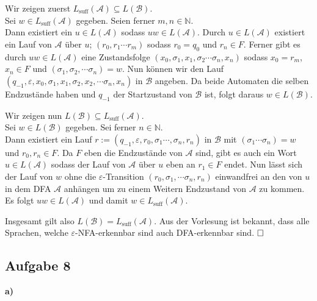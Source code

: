 \documentclass[a4paper,graphics,11pt]{article}
\newcommand{\aufgabe}[1]{\subsection*{Aufgabe #1}}
\begin{document}
Wir zeigen zuerst $L_{\text{suff}}(\mathcal{A}) \subseteq L(\mathcal{B})$.\\[2pt]
Sei $w \in L_{\text{suff}}(\mathcal{A})$ gegeben. Seien ferner $m,n \in \mathbb{N}$.\\
Dann existiert ein $u \in L(\mathcal{A})$ sodass $uw \in L(\mathcal{A})$.
Durch $u \in L(\mathcal{A})$ existiert ein Lauf von $\mathcal{A}$ über $u$;
$(r_0, r_1 \cdots r_m)$ sodass $r_0 = q_0$ und $r_n \in F$.
Ferner gibt es durch $uw \in L(\mathcal{A})$ eine Zustandsfolge
$(x_0, \sigma_1, x_1, \sigma_2 \cdots \sigma_n, x_n)$ sodass $x_0 = r_m$, $x_n \in F$ und
$(\sigma_1, \sigma_2, \cdots \sigma_n) = w$. Nun können wir den Lauf $(q_{-1}, \varepsilon, x_0, \sigma_1, x_1, \sigma_2, x_2, \cdots \sigma_n, x_n)$ in $\mathcal{B}$ angeben. Da beide
Automaten die selben Endzustände haben und $q_{-1}$ der Startzustand von $\mathcal{B}$ ist, folgt daraus $w \in L(\mathcal{B})$.
\newpage

Wir zeigen nun $L(\mathcal{B}) \subseteq L_{\text{suff}}(\mathcal{A})$.\\[2pt]
Sei $w \in L(\mathcal{B})$ gegeben. Sei ferner $n \in \mathbb{N}$.\\
Dann existiert ein Lauf $r := (q_{-1}, \varepsilon, r_0, \sigma_1 \cdots, \sigma_n, r_n)$
in $\mathcal{B}$ mit $(\sigma_1 \cdots \sigma_n) = w$ und $r_0, r_n \in F$.
Da $F$ eben die Endzustände von $\mathcal{A}$ sind, gibt es auch ein Wort $u \in L(\mathcal{A})$ sodass der Lauf von $\mathcal{A}$ über $u$ eben an $r_1 \in F$ endet. Nun lässt sich der Lauf
von $w$ ohne die $\varepsilon$-Transition $(r_0, \sigma_1, \cdots \sigma_n, r_n)$ einwandfrei
an den von $u$ in dem DFA $\mathcal{A}$ anhängen um zu einem Weitern Endzustand von $\mathcal{A}$ zu kommen. Es folgt $uw \in L(\mathcal{A})$ und damit $w \in L_{\text{suff}}(\mathcal{A})$.

Insgesamt gilt also $L(\mathcal{B}) = L_{\text{suff}}(\mathcal{A})$. Aus der Vorlesung ist
bekannt, dass alle Sprachen, welche $\varepsilon$-NFA-erkennbar sind auch DFA-erkennbar sind.
$\hfill\square$

\aufgabe{8}
\textbf{a)}\\
\end{document}
